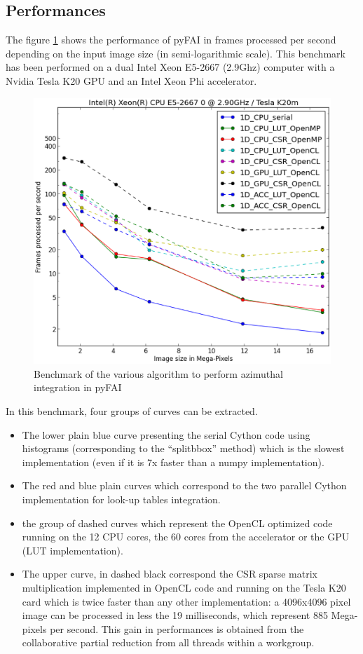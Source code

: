 \documentclass[preprint]{iucr}
\begin{document}
\subsection{Performances}
The figure \ref{benchmark} shows the performance of pyFAI in frames processed per
second depending on the input image size (in semi-logarithmic scale).
This benchmark has been performed on a dual Intel Xeon E5-2667 (2.9Ghz) computer
with a Nvidia Tesla K20 GPU and an Intel Xeon Phi accelerator.

\begin{figure}
\label{benchmark}
\begin{center}
\includegraphics[width=15cm]{benchmark.eps}
\caption{Benchmark of the various algorithm to perform azimuthal integration in
pyFAI}
\end{center}
\end{figure}

In this benchmark, four groups of curves can be extracted.
\begin{itemize}
  \item The lower plain blue curve presenting the serial Cython code using
  histograms (corresponding to the ``splitbbox'' method) which is the slowest
  implementation (even if it is 7x faster than a numpy implementation).
  \item The red and blue plain curves which correspond to the two parallel
  Cython implementation for look-up tables integration.
  \item the group of dashed curves which represent the OpenCL optimized code
  running on the 12 CPU cores, the 60 cores from the accelerator or the GPU (LUT
  implementation).
  \item The upper curve, in dashed black correspond the CSR sparse matrix
  multiplication implemented in OpenCL code and running on the Tesla K20 card
  which is twice faster than any other implementation: a 4096x4096 pixel image
  can be processed in less the 19 milliseconds, which represent 885 Mega-pixels
  per second. This gain in performances is obtained from the collaborative
  partial reduction from all threads within a workgroup.
\end{itemize}
\end{document}
